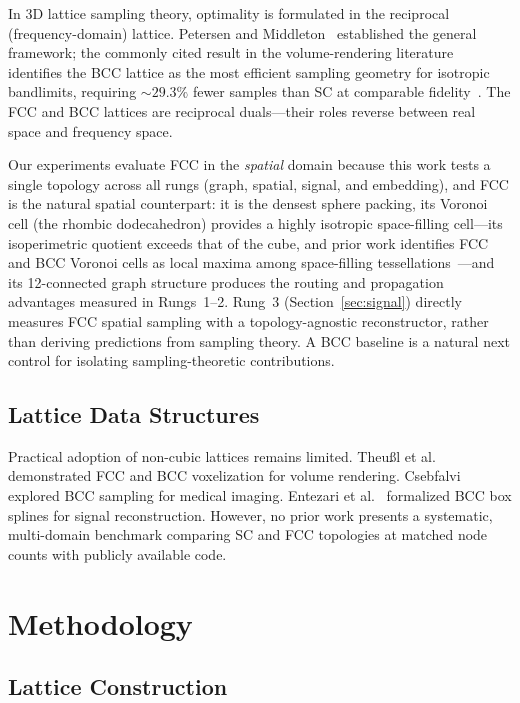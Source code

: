 \documentclass[11pt]{article}
\begin{document}
In 3D lattice sampling theory, optimality is formulated in the
reciprocal (frequency-domain) lattice. Petersen and
Middleton~\cite{petersen1962} established the general framework;
the commonly cited result in the volume-rendering literature
identifies the BCC lattice as the most efficient sampling geometry
for isotropic bandlimits, requiring ${\sim}29.3\%$ fewer samples
than SC at comparable fidelity~\cite{theussl2002orvs,theussl2001}.
The FCC and BCC lattices are reciprocal duals---their roles
reverse between real space and frequency space.

Our experiments evaluate FCC in the \emph{spatial} domain because
this work tests a single topology across all rungs (graph,
spatial, signal, and embedding), and FCC is the natural spatial
counterpart: it is the densest sphere packing, its Voronoi cell
(the rhombic dodecahedron) provides a highly isotropic space-filling
cell---its isoperimetric quotient exceeds that of the cube, and prior
work identifies FCC and BCC Voronoi cells as local maxima among
space-filling tessellations~\cite{conway1999}---and its 12-connected
graph structure produces the routing and propagation advantages
measured in Rungs~1--2. Rung~3 (Section~\ref{sec:signal})
directly measures FCC spatial sampling with a topology-agnostic
reconstructor, rather than deriving predictions from sampling
theory. A BCC baseline is a natural next control for isolating
sampling-theoretic contributions.

\subsection{Lattice Data Structures}

Practical adoption of non-cubic lattices remains limited.
Theu{\ss}l et al.~\cite{theussl2001} demonstrated FCC and BCC
voxelization for volume rendering. Csebfalvi~\cite{csebfalvi2010}
explored BCC sampling for medical imaging. Entezari et
al.~\cite{entezari2004} formalized BCC box splines for
signal reconstruction. However, no prior work presents a
systematic, multi-domain benchmark comparing SC and FCC topologies
at matched node counts with publicly available code.

\section{Methodology}
\label{sec:method}

\subsection{Lattice Construction}
\end{document}
